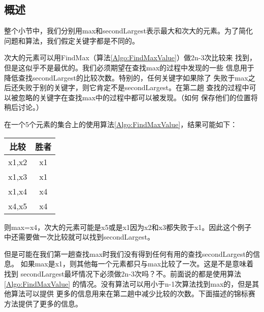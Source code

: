 \subsection{概述}
整个小节中，我们分别用max和secondLargest表示最大和次大的元素。为了简化
问题和算法，我们假定关键字都是不同的。

次大的元素可以用FindMax（算法\ref{Algo:FindMaxValue}）做2n-3次比较来
找到，但是这似乎不是最优的。我们必须期望在查找max的过程中发现的一些
信息用于降低查找secondLargest的比较次数。特别的，任何关键字如果除了
失败于max之后还失败于别的关键字，则它肯定不是secondLargest。在第二趟
查找的过程中可以被忽略的关键字在查找max中的过程中都可以被发现。（如何
保存他们的位置将稍后讨论。）

在一个5个元素的集合上的使用算法\ref{Algo:FindMaxValue}，结果可能如下：
\begin{center}
\begin{tabular}{cc}
\hline
比较 &胜者\\
\hline
x1,x2   &x1\\
x1,x3   &x1\\
x1,x4   &x4\\
x4,x5   &x4\\
\hline
\end{tabular}
\end{center}

则max=x4，次大的元素可能是x5或是x1因为x2和x3都失败于x1。因此这个例子
中还需要做一次比较就可以找到secondLargest。

但是可能在我们第一趟查找max时我们没有得到任何有用的查找secondLargest的信息。
如果max是x1，则其他每一个元素都只与max比较了一次。这是不是意味着找到
secondLargest最坏情况下必须做2n-3次吗？不。前面说的都是使用算法\ref{Algo:FindMaxValue}
的情况。没有算法可以用小于n-1次算法找到max的，但是其他算法可以提供
更多的信息用来在第二趟中减少比较的次数。下面描述的锦标赛方法提供了更多的信息。

